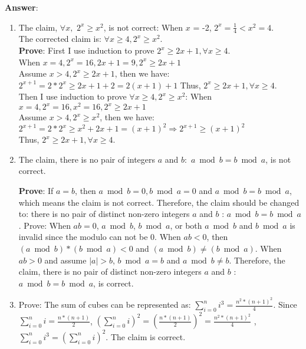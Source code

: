 \documentclass{article}%
\begin{document}
\begin{enumerate}
	\textbf{Answer}:
	\begin{enumerate}
	\item The claim, $\forall x,$ $2^x \geq x^2$, is not correct: When $x$ = -2, $2^x = \frac{1}{4} < x^2 = 4$. \\
	The corrected claim is: $\forall x \geq 4, 2^x \geq x^2$. \\
	\textbf{Prove}:
	First I use induction to prove $2^{x} \geq 2x + 1, \forall x \geq 4$. \\
	When $x = 4, 2^{x} = 16, 2x + 1 = 9, 2^{x} \geq 2x + 1$ \\
	Assume $x > 4, 2^{x} \geq 2x + 1$, then we have: \\
	$ 2^{x + 1} = 2*2^{x} \geq 2x + 1 + 2 = 2(x+1) + 1 $
	Thus, $2^{x} \geq 2x + 1, \forall x \geq 4$. \\
	Then I use induction to prove $\forall x \geq 4, 2^x \geq x^2$:
	When $x = 4, 2^{x} = 16, x^{2} = 16, 2^{x} \geq 2x + 1$ \\
	Assume $x > 4, 2^{x} \geq x^{2}$, then we have: \\
	$ 2^{x + 1} = 2*2^{x} \geq x^{2} + 2x + 1 = (x+1)^{2} \Rightarrow 2^{x + 1} \geq (x+1)^2 $ \\
	Thus, $2^{x} \geq 2x + 1, \forall x \geq 4$.
	
	\item The claim, there is no pair of integers $a$ and $b:$ $a\bmod b = b\bmod a$, is not correct. 
		
	\textbf{Prove}:
	If $a=b$, then $a\bmod b = 0, b\bmod a = 0$ and $a\bmod b = b\bmod a$, which means the claim is not correct. Therefore, the claim should be changed to: there is no pair of distinct non-zero integers $a$ and $b$ : $a\bmod b = b\bmod a$. Prove: When $ab = 0$, $a \bmod b$, $b \bmod a$, or both $a \bmod b$ and $b \bmod a$ is invalid since the modulo can not be 0. When $ab < 0$, then $(a \bmod b)*(b \bmod a) < 0$ and $(a \bmod b) \neq (b \bmod a)$. When $ab > 0$ and assume $|a| > b$, $b \bmod a = b$ and $a \bmod b \neq b$. Therefore, the claim, there is no pair of distinct non-zero integers $a$ and $b$ : $a\bmod b = b\bmod a$, is correct.
		
	\item Prove: The sum of cubes can be represented as: $\sum\limits_{i = 0}^n {i^3 }  = \frac{n^{2}*(n+1)^{2}}{4}$. Since ${\sum\limits_{i = 0}^n i } = \frac{n*(n+1)}{2}$, $\left( {\sum\limits_{i = 0}^n i } \right)^2 = (\frac{n*(n+1)}{2})^{2} = \frac{n^{2}*(n+1)^{2}}{4}$ , $\sum\limits_{i = 0}^n {i^3 }  = \left( {\sum\limits_{i = 0}^n i } \right)^2 $. The claim is correct. 
	\end{enumerate}
	

\end{enumerate}
\end{document}
